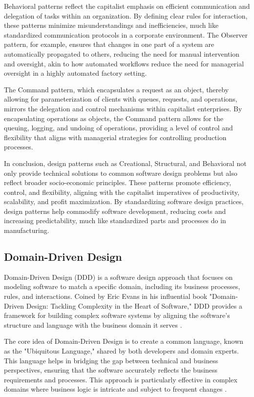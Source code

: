 \begin{refsection}
Behavioral patterns reflect the capitalist emphasis on efficient communication and delegation of tasks within an organization. By defining clear rules for interaction, these patterns minimize misunderstandings and inefficiencies, much like standardized communication protocols in a corporate environment. The Observer pattern, for example, ensures that changes in one part of a system are automatically propagated to others, reducing the need for manual intervention and oversight, akin to how automated workflows reduce the need for managerial oversight in a highly automated factory setting.

The Command pattern, which encapsulates a request as an object, thereby allowing for parameterization of clients with queues, requests, and operations, mirrors the delegation and control mechanisms within capitalist enterprises. By encapsulating operations as objects, the Command pattern allows for the queuing, logging, and undoing of operations, providing a level of control and flexibility that aligns with managerial strategies for controlling production processes.

In conclusion, design patterns such as Creational, Structural, and Behavioral not only provide technical solutions to common software design problems but also reflect broader socio-economic principles. These patterns promote efficiency, control, and flexibility, aligning with the capitalist imperatives of productivity, scalability, and profit maximization. By standardizing software design practices, design patterns help commodify software development, reducing costs and increasing predictability, much like standardized parts and processes do in manufacturing.

\subsection{Domain-Driven Design}

Domain-Driven Design (DDD) is a software design approach that focuses on modeling software to match a specific domain, including its business processes, rules, and interactions. Coined by Eric Evans in his influential book "Domain-Driven Design: Tackling Complexity in the Heart of Software," DDD provides a framework for building complex software systems by aligning the software’s structure and language with the business domain it serves \cite[pp.~20-23]{Evans2004}.

The core idea of Domain-Driven Design is to create a common language, known as the "Ubiquitous Language," shared by both developers and domain experts. This language helps in bridging the gap between technical and business perspectives, ensuring that the software accurately reflects the business requirements and processes. This approach is particularly effective in complex domains where business logic is intricate and subject to frequent changes \cite[pp.~30-32]{Evans2004}.


\end{refsection}
